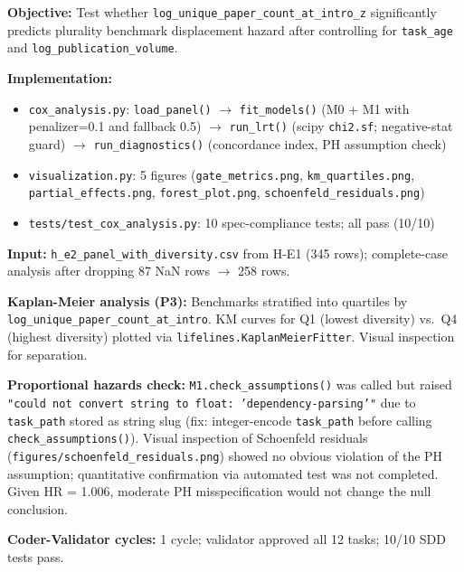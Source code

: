 \textbf{Objective:} Test whether \texttt{log\_unique\_paper\_count\_at\_intro\_z} significantly predicts plurality benchmark displacement hazard after controlling for \texttt{task\_age} and \texttt{log\_publication\_volume}.

\textbf{Implementation:}
\begin{itemize}
  \item \texttt{cox\_analysis.py}: \texttt{load\_panel()} $\to$ \texttt{fit\_models()} (M0 + M1 with penalizer=0.1 and fallback 0.5) $\to$ \texttt{run\_lrt()} (scipy \texttt{chi2.sf}; negative-stat guard) $\to$ \texttt{run\_diagnostics()} (concordance index, PH assumption check)
  \item \texttt{visualization.py}: 5 figures (\texttt{gate\_metrics.png}, \texttt{km\_quartiles.png}, \texttt{partial\_effects.png}, \texttt{forest\_plot.png}, \texttt{schoenfeld\_residuals.png})
  \item \texttt{tests/test\_cox\_analysis.py}: 10 spec-compliance tests; all pass (10/10)
\end{itemize}

\textbf{Input:} \texttt{h\_e2\_panel\_with\_diversity.csv} from H-E1 (345 rows); complete-case analysis after dropping 87 NaN rows $\to$ 258 rows.

\textbf{Kaplan-Meier analysis (P3):} Benchmarks stratified into quartiles by \texttt{log\_unique\_paper\_count\_at\_intro}. KM curves for Q1 (lowest diversity) vs.\ Q4 (highest diversity) plotted via \texttt{lifelines.KaplanMeierFitter}. Visual inspection for separation.

\textbf{Proportional hazards check:} \texttt{M1.check\_assumptions()} was called but raised \texttt{"could not convert string to float: 'dependency-parsing'"} due to \texttt{task\_path} stored as string slug (fix: integer-encode \texttt{task\_path} before calling \texttt{check\_assumptions()}). Visual inspection of Schoenfeld residuals (\texttt{figures/schoenfeld\_residuals.png}) showed no obvious violation of the PH assumption; quantitative confirmation via automated test was not completed. Given HR = 1.006, moderate PH misspecification would not change the null conclusion.

\textbf{Coder-Validator cycles:} 1 cycle; validator approved all 12 tasks; 10/10 SDD tests pass.
